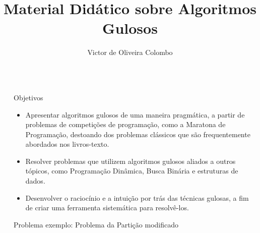 \documentclass[final,hyperref={pdfpagelabels=false}]{beamer}
\title{\huge Material Didático sobre Algoritmos Gulosos} %
\author{Victor de Oliveira Colombo} %
\institute{Instituto de Matemática e Estatística da Universidade de São Paulo} %
\begin{document}

\begin{frame}[t] %

\begin{columns}[t] %

\begin{column}{.02\textwidth}\end{column} %

\begin{column}{.465\textwidth} %


\begin{block}{Objetivos}

\begin{itemize}

\item Apresentar algoritmos gulosos de uma maneira pragmática, a partir de problemas
de competições de programação, como a Maratona de Programação, destoando dos problemas
clássicos que são frequentemente abordados nos livros-texto.

\item Resolver problemas que utilizem algoritmos gulosos aliados a outros tópicos, como Programação Dinâmica, Busca Binária e estruturas de dados.

\item Desenvolver o raciocínio e a intuição por trás das técnicas gulosas, a fim de criar uma ferramenta
sistemática para resolvê-los.

\end{itemize}

\end{block}

            
\begin{block}{Problema exemplo: Problema da Partição modificado}
\begin{itemize}


\end{itemize}
\end{block}
\end{column}
\end{columns}
\end{frame}
\end{document}
